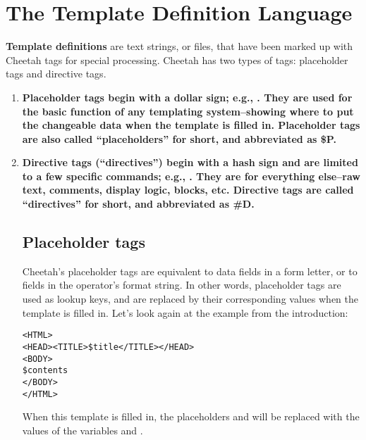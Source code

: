 \section{The Template Definition Language}


{\bf Template definitions} are text strings, or files, that have been marked up
with Cheetah tags for special processing.  Cheetah has two types of tags:
placeholder tags and directive tags.  

\begin{enumerate}

    \item \bf{Placeholder tags} begin with a dollar sign;
	e.g., .  They are used for the basic function of
	any templating system--showing where to put the changeable data when
	the template is filled in.  Placeholder tags are also called
	``placeholders'' for short, and abbreviated as \bf{\$P}.

     \item \bf{Directive tags} (``directives'') begin with a hash sign and are
	limited to a few specific commands; e.g., .  They are for
        everything else--raw text, comments, display logic, blocks, etc.
	Directive tags are called ``directives'' for short, and abbreviated as
	\bf{#D}.



\subsection{Placeholder tags}

Cheetah's placeholder tags are equivalent to data fields in a form letter, or to
 fields in the \code{\%} operator's format string.
In other words, placeholder tags are used as lookup keys, and are replaced by
their corresponding values when the template is filled in.
Let's look again at the example from the introduction:

\begin{verbatim}
<HTML>
<HEAD><TITLE>$title</TITLE></HEAD>
<BODY>
$contents
</BODY>
</HTML>
\end{verbatim}

When this template is filled in, the placeholders  and
 will be replaced with the values of the variables 
and .


\end{enumerate}
